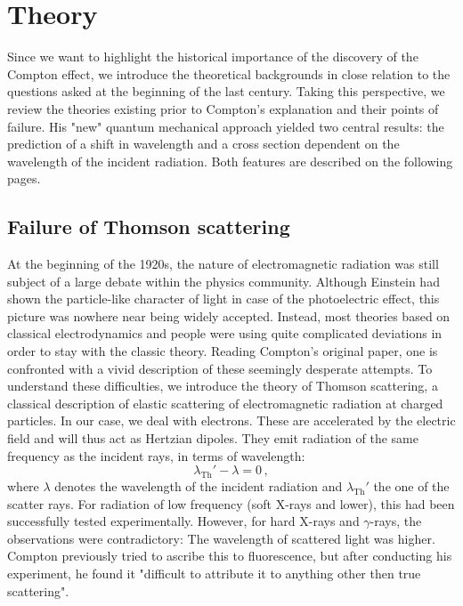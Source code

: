 \section{Theory}
\label{sec:theory}
Since we want to highlight the historical importance of the discovery of the Compton effect, we introduce the theoretical 
backgrounds in close relation to the questions asked at the beginning of the last century. Taking this perspective, we 
review the theories existing prior to Compton's explanation and their points of failure. His "new" quantum mechanical 
approach yielded two central results: the prediction of a shift in wavelength and a cross section dependent on the 
wavelength of the incident radiation. Both features are described on the following pages. 

\subsection{Failure of Thomson scattering}
\label{sec:thomson}
At the beginning of the 1920s, the nature of electromagnetic radiation was still subject of a large debate within the 
physics community. Although Einstein had shown the particle-like character of light in case of the photoelectric effect, 
this picture was nowhere near being widely accepted. Instead, most theories based on classical electrodynamics and people 
were using quite complicated deviations in order to stay with the classic theory. Reading Compton's original paper, one is 
confronted with a vivid description of these seemingly desperate attempts.\cite{compton} 
To understand these difficulties, we introduce the 
theory of Thomson scattering, a classical description of elastic scattering of electromagnetic radiation at charged 
particles. In our case, we deal with electrons. These are accelerated by the electric field and will thus act as Hertzian 
dipoles. They emit radiation of the same frequency as the incident rays, in terms of wavelength:
\begin{equation}
    \lambda_\text{Th}' - \lambda = 0\, ,	
    \label{eq:thomsom_lamb}
\end{equation}
where $\lambda$ denotes the wavelength of the incident radiation and $\lambda_\text{Th}'$ the one of the scatter rays.
For radiation of low frequency (soft X-rays and lower), this had been successfully tested experimentally. However, for 
hard X-rays and $\gamma$-rays, the observations were contradictory: The wavelength of scattered light was higher. Compton 
previously tried to ascribe this to fluorescence, but after conducting his experiment, he found it "difficult to attribute
it to anything other then true scattering"\cite{compton}. 

